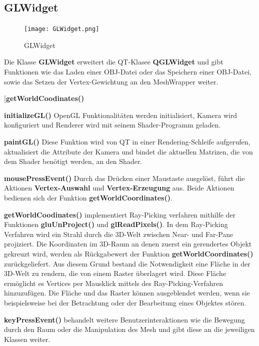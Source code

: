 \subsection{GLWidget}

\begin{figure}[H]
\centering
\texttt{[image: GLWidget.png]}
\caption{GLWidget}
\label{fig2}
\end{figure}

Die Klasse \textbf{GLWidget} erweitert die QT-Klasee \textbf{QGLWidget} und gibt Funktionen wie das Laden einer OBJ-Datei oder das Speichern einer OBJ-Datei, sowie das Setzen der Vertex-Gewichtung an den MeshWrapper weiter.\newline\newline

\begin{labeling}[]{[\textbf{getWorldCoodinates()}}%
\item[\textbf{initializeGL()}] OpenGL Funktionalitäten werden initialisiert, Kamera wird konfiguriert und Renderer wird mit seinem Shader-Programm geladen.
\item[\textbf{paintGL()}] Diese Funktion wird von QT in einer Rendering-Schleife aufgerufen, aktualisiert die Attribute der Kamera und bindet die aktuellen Matrizen, die von dem Shader benötigt werden, an den Shader.
\item[\textbf{mousePressEvent()}] Durch das Drücken einer Maustaste ausgelöst, führt die Aktionen \textbf{Vertex-Auswahl} und \textbf{Vertex-Erzeugung} aus. Beide Aktionen bedienen sich der Funktion \textbf{getWorldCoordinates()}.
\item[\textbf{getWorldCoodinates()}] implementiert Ray-Picking verfahren mithilfe der Funktionen \textbf{gluUnProject()} und \textbf{glReadPixels()}. In dem Ray-Picking Verfahren wird ein Strahl durch die 3D-Welt zwischen Near- und Far-Pane projiziert. Die Koordinaten im 3D-Raum an denen zuerst ein gerendertes Objekt gekreuzt wird, werden als Rückgabewert der Funktion \textbf{getWorldCoordinates()} zurückgeliefert. Aus diesem Grund bestand die Notwendigkeit eine Fläche in der 3D-Welt zu rendern, die von einem Raster überlagert wird. Diese Fläche ermöglicht es Vertices per Mausklick mittels des Ray-Picking-Verfahren hinzuzufügen. Die Fläche und das Raster können ausgeblendet werden, wenn sie beispielsweise bei der Betrachtung oder der Bearbeitung eines Objektes stören.
\item[\textbf{keyPressEvent()}] behandelt weitere Benutzerinteraktionen wie die Bewegung durch den Raum oder die Manipulation des Mesh und gibt diese an die jeweiligen Klassen weiter.
\end{labeling}

